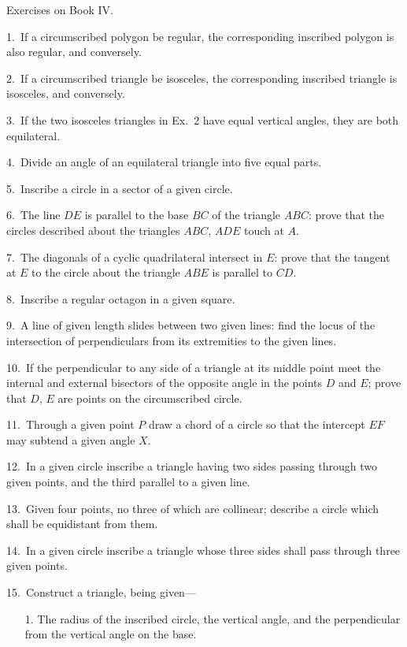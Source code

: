 \documentclass[oneside]{book}
\newcommand\exhead[1]{
\Needspace*{5\baselineskip}\begin{center}
\textsf{#1}
\end{center}
}
\begin{document}
\exhead{Exercises on Book IV\@.}

\begin{footnotesize}
1.~If a circumscribed polygon be regular, the corresponding
inscribed polygon is also regular, and conversely.

2.~If a circumscribed triangle be isosceles, the corresponding
inscribed triangle is isosceles, and conversely.

3.~If the two isosceles triangles in Ex.~2 have equal vertical
angles, they are both equilateral.

4.~Divide an angle of an equilateral triangle into five equal
parts.

5.~Inscribe a circle in a sector of a given circle.

6.~The line $DE$ is parallel to the base $BC$ of the triangle $ABC$:
prove that the circles described about the triangles $ABC$, $ADE$
touch at $A$.

7.~The diagonals of a cyclic quadrilateral intersect in $E$: prove
that the tangent at $E$ to the circle about the triangle $ABE$ is
parallel to $CD$.

8.~Inscribe a regular octagon in a given square.

9.~A line of given length slides between two given lines: find
the locus of the intersection of perpendiculars from its extremities
to the given lines.

10.~If the perpendicular to any side of a triangle at its middle
point meet the internal and external bisectors of the opposite
angle in the points $D$ and $E$; prove that $D$, $E$ are points on the
circumscribed circle.


11.~Through a given point $P$ draw a chord of a circle so that
the intercept $EF$ may subtend a given angle $X$.

12.~In a given circle inscribe a triangle having two sides passing
through two given points, and the third parallel to a given
line.

13.~Given four points, no three of which are collinear; describe
a circle which shall be equidistant from them.

14.~In a given circle inscribe a triangle whose three sides shall
pass through three given points.

15.~Construct a triangle, being given---
\begin{changemargin}{0.3in}{0in}
\begin{enumerate}
\item[1.] The radius of the inscribed circle, the vertical angle,
and the perpendicular from the vertical angle on the
base.


\end{enumerate}
\end{changemargin}
\end{footnotesize}
\end{document}
